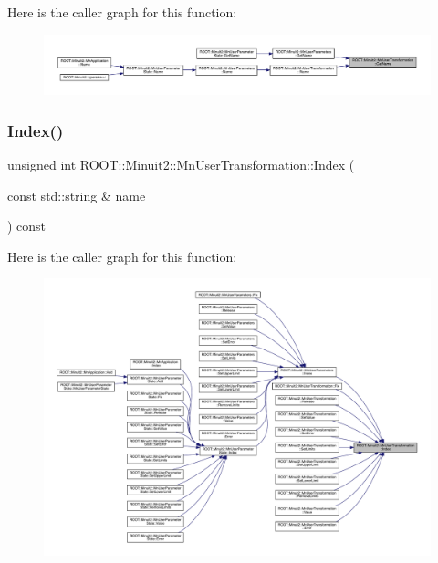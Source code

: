 Here is the caller graph for this function\+:\nopagebreak
\begin{figure}[H]
\begin{center}
\leavevmode
\includegraphics[width=350pt]{d9/d98/classROOT_1_1Minuit2_1_1MnUserTransformation_aa9cb2ec1cc12b7aec1160394bb95833d_icgraph}
\end{center}
\end{figure}
\mbox{\label{classROOT_1_1Minuit2_1_1MnUserTransformation_aa4173a2f341790d8e61635eeed2555bb}} 
\subsubsection{\texorpdfstring{Index()}{Index()}\hspace{0.1cm}{\footnotesize\ttfamily [1/2]}}
{\footnotesize\ttfamily unsigned int R\+O\+O\+T\+::\+Minuit2\+::\+Mn\+User\+Transformation\+::\+Index (\begin{DoxyParamCaption}\item[{const std\+::string \&}]{name }\end{DoxyParamCaption}) const}

Here is the caller graph for this function\+:\nopagebreak
\begin{figure}[H]
\begin{center}
\leavevmode
\includegraphics[width=350pt]{d9/d98/classROOT_1_1Minuit2_1_1MnUserTransformation_aa4173a2f341790d8e61635eeed2555bb_icgraph}
\end{center}
\end{figure}
\mbox{\label{classROOT_1_1Minuit2_1_1MnUserTransformation_aa4173a2f341790d8e61635eeed2555bb}} 
